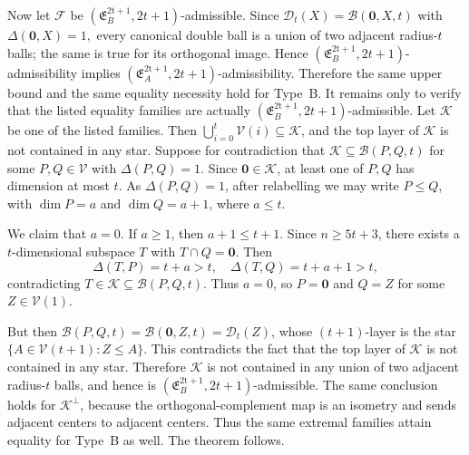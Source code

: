 \documentclass[11pt]{article}
\theoremstyle{definition}
\begin{document}
Now let $\mathcal F$ be $(\mathfrak E_B^{\mathrm{2t+1}},2t+1)$-admissible. 
Since
\(
\mathcal D_t(X)=\mathcal B(\boldsymbol0,X,t)\)
with
\(\Delta(\boldsymbol0,X)=1,
\)
every canonical double ball is a union of two adjacent radius-\(t\) balls; the same is true for its orthogonal image. Hence \((\mathfrak E_B^{\mathrm{2t+1}},2t+1)\)-admissibility implies \((\mathfrak E_A^{\mathrm{2t+1}},2t+1)\)-admissibility.
Therefore the same upper bound and the same equality necessity hold for Type~B. 
It remains only to verify that the listed equality families are actually $(\mathfrak E_B^{\mathrm{2t+1}},2t+1)$-admissible. Let $\mathcal K$ be one of the listed families. 
Then $\bigcup_{i=0}^{t}\mathcal V(i)\subseteq\mathcal K$, and the top layer of $\mathcal K$ is not contained in any star. 
Suppose for contradiction that $\mathcal K\subseteq \mathcal B(P,Q,t)$ for some $P,Q\in\mathcal V$ with $\Delta(P,Q)=1$. 
Since $\boldsymbol 0\in\mathcal K$, at least one of $P,Q$ has dimension at most $t$. 
As $\Delta(P,Q)=1$, after relabelling we may write $P\le Q$, with $\dim P=a$ and $\dim Q=a+1$, where $a\le t$.

We claim that $a=0$. 
If $a\ge 1$, then $a+1\le t+1$. 
Since $n\ge 5t+3$, there exists a $t$-dimensional subspace $T$ with $T\cap Q=\boldsymbol 0$. 
Then
\[
\Delta(T,P)=t+a>t,\quad \Delta(T,Q)=t+a+1>t,
\]
contradicting $T\in\mathcal K\subseteq \mathcal B(P,Q,t)$. 
Thus $a=0$, so $P=\boldsymbol 0$ and $Q=Z$ for some $Z\in\mathcal V(1)$.

But then $\mathcal B(P,Q,t)=\mathcal B(\boldsymbol 0,Z,t)=\mathcal D_t(Z)$, whose $(t+1)$-layer is the star $\{A\in\mathcal V(t+1):Z\le A\}$. 
This contradicts the fact that the top layer of $\mathcal K$ is not contained in any star. 
Therefore $\mathcal K$ is not contained in any union of two adjacent radius-$t$ balls, and hence is $(\mathfrak E_B^{\mathrm{2t+1}},2t+1)$-admissible. 
The same conclusion holds for $\mathcal K^\perp$, because the orthogonal-complement map is an isometry and sends adjacent centers to adjacent centers. Thus the same extremal families attain equality for Type~B as well. 
The theorem follows.
\end{document}
